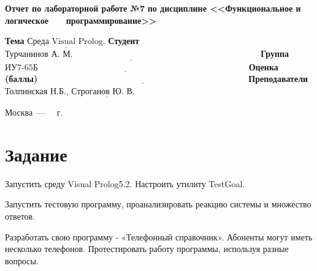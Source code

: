 \documentclass[12pt]{report}
\begin{document}
\begin{titlepage}
		\begin{center}
			\noindent\begin{minipage}{1.1\textwidth}\centering
				\Large\textbf{Отчет по лабораторной работе №7}\newline
				\textbf{по дисциплине <<Функциональное и логическое}\newline
				\textbf{~~~программирование>>}\newline\newline
			\end{minipage}
		\end{center}
		
		\noindent\textbf{Тема} $\underline{\text{Среда Visual Prolog.}}$\newline\newline
		\noindent\textbf{Студент} $\underline{\text{Турчанинов А. М.~~~~~~~~~~~~~~~~~~~~~~~~~~~~~~~~~~~~~~~~~~~~~~~~~~~~~~~~~~~~~~~~~}}$\newline\newline
		\noindent\textbf{Группа} $\underline{\text{ИУ7-65Б~~~~~~~~~~~~~~~~~~~~~~~~~~~~~~~~~~~~~~~~~~~~~~~~~~~~~~~~~~~~~~~~~~~~~~~~~}}$\newline\newline
		\noindent\textbf{Оценка (баллы)} $\underline{\text{~~~~~~~~~~~~~~~~~~~~~~~~~~~~~~~~~~~~~~~~~~~~~~~~~~~~~~~~~~~~~~~~~~~~~~~~}}$\newline\newline
		\noindent\textbf{Преподаватели} $\underline{\text{Толпинская Н.Б., Строганов Ю. В.~~~~~~~~~~~~~~~~~~~~~~~~~~}}$\newline\newline\newline
		
		\begin{center}
			\vfill
			Москва~---~\the\year
			~г.
		\end{center}
	\end{titlepage}

\section*{Задание}
Запустить среду Visual Prolog5.2. Настроить утилиту TestGoal.

Запустить тестовую программу, проанализировать реакцию системы и множество ответов.

Разработать свою программу - «Телефонный справочник». Абоненты могут иметь несколько телефонов. Протестировать работу программы, используя разные вопросы. 
\end{document}
